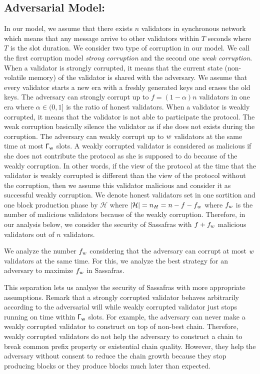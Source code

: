 \subsection{Adversarial Model:} 
In our model, we assume that there exists $ n $ validators in synchronous network which means that any message arrive to other validators within $ T $ seconds where $ T $ is the slot duration. We consider two type of corruption in our model. We call the first corruption model \emph{strong corruption} and the second one \emph{weak corruption}. When a validator is strongly corrupted, it means that the current state (non-volatile memory) of the validator is shared with the adversary. We assume that every validator starts a new era with a freshly generated keys and erases the old keys. The adversary can strongly corrupt up to $ f = (1-\alpha)n $ validators in one era where $ \alpha \in (0,1] $ is the ratio of honest validators.  
When a validator is weakly corrupted, it means that the validator is not able to participate the protocol. The weak corruption basically silence the validator as if she does not exists during the corruption. The adversary can weakly corrupt up to $ w $ validators at the same time at most  $ \mathsf{\Gamma_{w}} $ slots. A weakly corrupted validator is considered as malicious if she does not contribute the protocol as she is supposed to do because of the weakly corruption.  In other words, if the view of the protocol at the time that the validator is weakly corrupted is different than the view of the protocol without the corruption, then we assume this validator malicious and consider it as successful weakly corruption.  We denote honest validators set in one sortition and one block production phase by $ \mathcal{H} $ where $ |\mathcal{H}| = n_H = n-f - f_{w}$ where $ f_{w} $ is the number of malicious validators because of the weakly corruption.  Therefore, in our analysis below, we consider the security of Sassafras with $ f + f_{w}$ malicious validators out of $ n $ validators. 

We analyze the number $ f_{w} $ considering that the adversary can corrupt at most $ w $ validators at the same time. For this, we analyze the best strategy for an adversary to maximize $ f_{w} $ in Sassafras.



This separation lets us analyse the security of Sassafras with more appropriate assumptions. Remark that a strongly corrupted validator behaves arbitrarily according to the adversarial will while weakly corrupted validator just stops running on time within $ \mathsf{\Gamma_{w}} $ slots. For example, the adversary can never make a weakly corrupted validator to construct on top of non-best chain. Therefore, weakly corrupted validators do not help  the adversary to construct a chain to break common prefix property or existential chain quality.  However, they help the adversary without consent to reduce the chain growth because they stop producing blocks or they produce blocks much later than expected.




